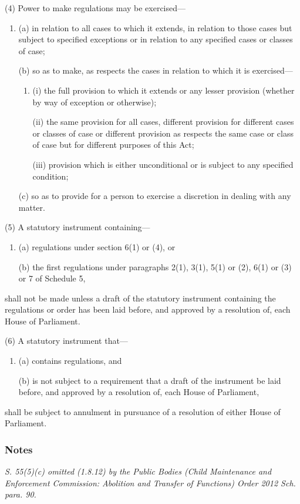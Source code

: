 \documentclass[a4paper]{article}
\newcommand\amendment[1]{\subsubsection*{Notes}{\itshape\frenchspacing\footnotesize #1 \par}}
\begin{document}
(4) Power to make regulations may be exercised---
\begin{enumerate}\item[]
(a) in relation to all cases to which it extends, in relation to those cases but subject to specified exceptions or in relation to any specified cases or classes of case;

(b) so as to make, as respects the cases in relation to which it is exercised---
\begin{enumerate}\item[]
(i) the full provision to which it extends or any lesser provision (whether by way of exception or otherwise);

(ii) the same provision for all cases, different provision for different cases or classes of case or different provision as respects the same case or class of case but for different purposes of this Act;

(iii) provision which is either unconditional or is subject to any specified condition;
\end{enumerate}

(c) so as to provide for a person to exercise a discretion in dealing with any matter.
\end{enumerate}

(5) A statutory instrument containing---
\begin{enumerate}\item[]
(a) regulations under section 6(1) or (4), or

(b) the first regulations under paragraphs 2(1), 3(1), 5(1) or (2), 6(1) or (3) or 7 of Schedule 5,%
%
\end{enumerate}
shall not be made unless a draft of the statutory instrument containing the regulations or order has been laid before, and approved by a resolution of, each House of Parliament.

(6) A statutory instrument that---
\begin{enumerate}\item[]
(a) contains regulations, and

(b) is not subject to a requirement that a draft of the instrument be laid before, and approved by a resolution of, each House of Parliament,
\end{enumerate}
shall be subject to annulment in pursuance of a resolution of either House of Parliament.

\amendment{
S. 55(5)(c) omitted (1.8.12) by the Public Bodies (Child Maintenance and Enforcement Commission: Abolition and Transfer of Functions) Order 2012 Sch. para. 90.
}
\end{document}
